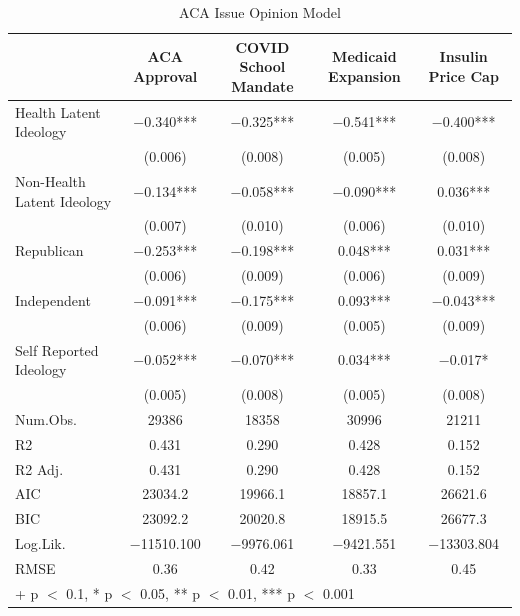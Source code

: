 \documentclass[
  oneside]{book}
\begin{document}
\begin{table}

\caption{\label{tab:acaopinion-model}ACA Issue Opinion Model}
\centering
\begin{tabular}[t]{lcccc}
\toprule
  & ACA Approval & COVID School Mandate & Medicaid Expansion & Insulin Price Cap\\
\midrule
Health Latent Ideology & \num{-0.340}*** & \num{-0.325}*** & \num{-0.541}*** & \num{-0.400}***\\
 & (\num{0.006}) & (\num{0.008}) & (\num{0.005}) & (\num{0.008})\\
Non-Health Latent Ideology & \num{-0.134}*** & \num{-0.058}*** & \num{-0.090}*** & \num{0.036}***\\
 & (\num{0.007}) & (\num{0.010}) & (\num{0.006}) & (\num{0.010})\\
Republican & \num{-0.253}*** & \num{-0.198}*** & \num{0.048}*** & \num{0.031}***\\
 & (\num{0.006}) & (\num{0.009}) & (\num{0.006}) & (\num{0.009})\\
Independent & \num{-0.091}*** & \num{-0.175}*** & \num{0.093}*** & \num{-0.043}***\\
 & (\num{0.006}) & (\num{0.009}) & (\num{0.005}) & (\num{0.009})\\
Self Reported Ideology & \num{-0.052}*** & \num{-0.070}*** & \num{0.034}*** & \num{-0.017}*\\
 & (\num{0.005}) & (\num{0.008}) & (\num{0.005}) & (\num{0.008})\\
\midrule
Num.Obs. & \num{29386} & \num{18358} & \num{30996} & \num{21211}\\
R2 & \num{0.431} & \num{0.290} & \num{0.428} & \num{0.152}\\
R2 Adj. & \num{0.431} & \num{0.290} & \num{0.428} & \num{0.152}\\
AIC & \num{23034.2} & \num{19966.1} & \num{18857.1} & \num{26621.6}\\
BIC & \num{23092.2} & \num{20020.8} & \num{18915.5} & \num{26677.3}\\
Log.Lik. & \num{-11510.100} & \num{-9976.061} & \num{-9421.551} & \num{-13303.804}\\
RMSE & \num{0.36} & \num{0.42} & \num{0.33} & \num{0.45}\\
\bottomrule
\multicolumn{5}{l}{\rule{0pt}{1em}+ p $<$ 0.1, * p $<$ 0.05, ** p $<$ 0.01, *** p $<$ 0.001}\\
\end{tabular}
\end{table}
\end{document}
